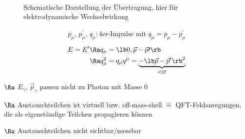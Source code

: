 \noindent {}\\
\begin{figure}[!ht]
\centering
{}
\caption{Schematische Darstellung der Übertragung, hier für elektrodynamische Wechselwirkung \label{fig:2.3}}
\end{figure}
\begin{align}
p_\mu, \, p^\prime_\mu,\, q_\mu : \text{4er-Impulse mit } q_\mu = p_\mu - p^\prime_\mu
\end{align}
\newpage
{}
\begin{align}
\begin{split}
E = E^\prime & \Ra q_\mu = \lb  0, \vec{p} -\vec{p}\prime \rb \\
 & \Ra q^2_\mu = q_\mu q^\mu = \underbrace{-\lb \vec{p} - \vec{p}^\prime\rb ^2}_{<0!}
\end{split}
\end{align}
\begin{compactitem}
\item[$\Ra$] $E_\gamma$, $\vec{p}_\gamma$ \glqq passen nicht\grqq{} zu Photon mit Masse 0
\item[$\Ra$] Austauschteilchen ist \glqq virtuell\grqq{} bzw. \glqq off-mass-shell\grqq{} $\hat{=}$ QFT-Feldanregungen, die  als eigenständige Teilchen propagieren können
\item[$\Ra$] Austauschteilchen nicht sichtbar/messbar
\end{compactitem}
